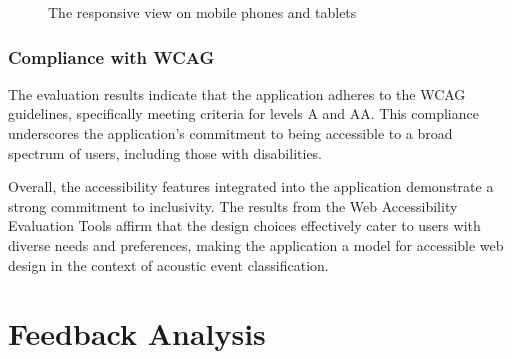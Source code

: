 \begin{figure}[!tbp]
  \centering
  \hfill
  \caption{\label{fig:responsive}The responsive view on mobile phones and tablets}
\end{figure}

\subsubsection{Compliance with WCAG}
The evaluation results indicate that the application adheres to the WCAG guidelines, specifically meeting criteria for levels A and AA. This compliance underscores the application's commitment to being accessible to a broad spectrum of users, including those with disabilities.

Overall, the accessibility features integrated into the application demonstrate a strong commitment to inclusivity. The results from the Web Accessibility Evaluation Tools affirm that the design choices effectively cater to users with diverse needs and preferences, making the application a model for accessible web design in the context of acoustic event classification.

\section{Feedback Analysis}
